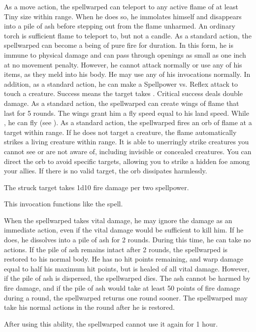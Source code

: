             As a move action, the spellwarped can teleport to any active flame of at least Tiny size within \rngmed range.
            When he does so, he immolates himself and disappears into a pile of ash before stepping out from the flame unharmed.
            An ordinary torch is sufficient flame to teleport to, but not a candle.
            As a standard action, the spellwarped can become a being of pure fire for \durshort duration.
            In this form, he is immune to physical damage and can pass through openings as small as one inch at no movement penalty.
            However, he cannot attack normally or use any of his items, as they meld into his body.
            He may use any of his invocations normally.
            In addition, as a standard action, he can make a Spellpower vs. Reflex attack to touch a creature.
            Success means the target takes .
            Critical success deals double damage.
            As a standard action, the spellwarped can create wings of flame that last for 5 rounds.
            The wings grant him a fly speed equal to his land speed.
            While \unencumbered, he can fly (see ).
            As a standard action, the spellwarped fires an orb of flame at a target within \rnglong range.
            If he does not target a creature, the flame automatically strikes a living creature within range.
            It is able to unerringly strike creatures you cannot see or are not aware of, including invisible or concealed creatures.
            You can direct the orb to avoid specific targets, allowing you to strike a hidden foe among your allies.
            If there is no valid target, the orb dissipates harmlessly.
            \par The struck target takes 1d10 fire damage per two spellpower.

            This invocation functions like the  spell.

            When the spellwarped takes vital damage, he may ignore the damage as an immediate action, even if the vital damage would be sufficient to kill him.
            If he does, he dissolves into a pile of ash for 2 rounds.
            During this time, he can take no actions.
            If the pile of ash remains intact after 2 rounds, the spellwarped is restored to his normal body.
            He has no hit points remaining, and warp damage equal to half his maximum hit points, but is healed of all vital damage.
            However, if the pile of ash is dispersed, the spellwarped dies.
            The ash cannot be harmed by fire damage, and if the pile of ash would take at least 50 points of fire damage during a round, the spellwarped returns one round sooner.
            The spellwarped may take his normal actions in the round after he is restored.
            \par After using this ability, the spellwarped cannot use it again for 1 hour.

